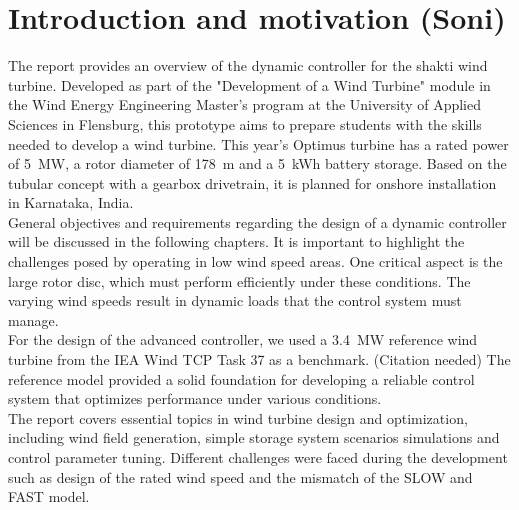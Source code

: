 \chapter{Introduction and motivation (Soni)}

The report provides an overview of the dynamic controller for the \gls{shakti} wind turbine. Developed as part of the "Development of a Wind Turbine" module in the Wind Energy Engineering Master’s program at the University of Applied Sciences in Flensburg, this prototype aims to prepare students with the skills needed to develop a wind turbine. This year’s Optimus turbine has a rated power of \SI{5}{MW}, a rotor diameter of \SI{178}{m} and a \SI{5}{kWh} battery storage. Based on the tubular concept with a gearbox drivetrain, it is planned for onshore installation in Karnataka, India.
\\[16pt]
General objectives and requirements regarding the design of a dynamic controller will be discussed in the following chapters. It is important to highlight the challenges posed by operating in low wind speed areas. One critical aspect is the large rotor disc, which must perform efficiently under these conditions. The varying wind speeds result in dynamic loads that the control system must manage.
\\[16pt]
For the design of the advanced controller, we used a \SI{3.4}{MW} reference wind turbine from the IEA Wind TCP Task 37 as a benchmark. (Citation needed) The reference model provided a solid foundation for developing a reliable control system that optimizes performance under various conditions.
\\[16pt]
The report covers essential topics in wind turbine design and optimization, including wind field generation, simple storage system scenarios simulations and control parameter tuning.
Different challenges were faced during the development such as design of the rated wind speed and the mismatch of the \gls{SLOW} and \gls{FAST} model. 
